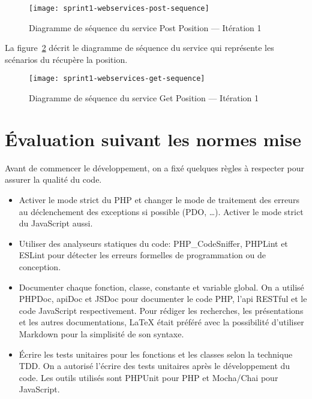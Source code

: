 \begin{figure}[htbp]
    \centering
    \texttt{[image: sprint1-webservices-post-sequence]}
    \caption{Diagramme de séquence du service Post Position --- Itération 1}
\label{fig:sprint1-webservices-post-sequence}
\end{figure}

La figure~\ref{fig:sprint1-webservices-get-sequence} décrit le diagramme de
séquence du service  qui représente les scénarios du
récupère la position.

\begin{figure}[htbp]
    \centering
    \texttt{[image: sprint1-webservices-get-sequence]}
    \caption{Diagramme de séquence du service Get Position --- Itération 1}
\label{fig:sprint1-webservices-get-sequence}
\end{figure}

\section{Évaluation suivant les normes mise}

Avant de commencer le développement, on a fixé quelques règles à respecter pour
assurer la qualité du code.

\begin{itemize}
    \item Activer le mode strict du PHP et changer le mode de traitement des
        erreurs au déclenchement des exceptions si possible (PDO, \ldots).
        Activer le mode strict du JavaScript aussi.
    \item Utiliser des analyseurs statiques du code: PHP\_CodeSniffer, PHPLint
        et ESLint pour détecter les erreurs formelles de programmation ou de
        conception.
    \item Documenter chaque fonction, classe, constante et variable global. On
        a utilisé PHPDoc, apiDoc et JSDoc pour documenter le code PHP, l'api
        RESTful et le code JavaScript respectivement. Pour rédiger les
        recherches, les présentations et les autres documentations, \LaTeX{}
        était préféré avec la possibilité d'utiliser Markdown pour la
        simplisité de son syntaxe.
    \item Écrire les tests unitaires pour les fonctions et les classes selon la
        technique \acrshort{TDD}. On a autorisé l'écrire des tests unitaires
        après le développement du code. Les outils utilisés sont PHPUnit pour
        PHP et Mocha/Chai pour JavaScript. 
\end{itemize}

